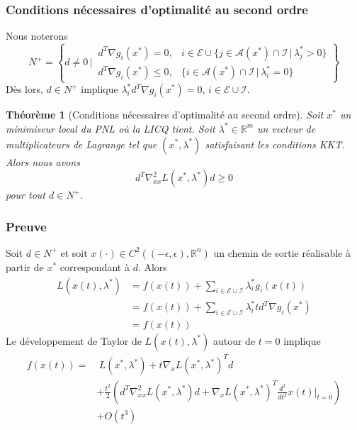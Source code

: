 \documentclass[usepdftitle=false]{beamer}
\newtheorem{thm}{Théorème}
\def\cA{\mathcal{A}}
\def\cE{\mathcal{E}}
\def\cI{\mathcal{I}}
\def\RR{\mathbb{R}}
\begin{document}
\begin{frame}
	\frametitle{Conditions nécessaires d'optimalité au second ordre}
	
Nous noterons
$$
N^+ =
\left\lbrace d \ne 0 \,\bigg|\,
\begin{matrix}
d^T \nabla g_i(x^*) = 0, & i \in \cE \cup \{ j \in \cA(x^*) \cap \cI \,|\, \lambda_j^* > 0 \} \\
d^T \nabla g_i(x^*) \leq 0, & \{ i \in \cA(x^*) \cap \cI \,|\, \lambda_i^* = 0 \} 
\end{matrix}
\right\rbrace
$$
Dès lors, $d \in N^+$ implique $\lambda_i^* d^T \nabla g_i(x^*) = 0$, $i \in \cE \cup \cI$.



\mbox{}

\begin{thm}[Conditions nécessaires d'optimalité au second ordre]
Soit $x^*$ un minimiseur local du PNL où la LICQ tient.
Soit $\lambda^* \in \RR^m$ un vecteur de multiplicateurs de Lagrange tel que $(x^*, \lambda^*)$ satisfaisant les conditions KKT.
Alors nous avons
$$
d^T \nabla^2_{xx} L(x^*, \lambda^*) d \geq 0
$$
pour tout $d \in N^+$.
\end{thm}

\end{frame}

\begin{frame}
\frametitle{Preuve}

Soit $d \in N^+$ et soit
$x(\cdot) \in C^2((-\epsilon, \epsilon), \RR^n)$
un chemin de sortie réalisable à partir de $x^*$ correspondant à $d$.
Alors
\begin{align*}
L(x(t), \lambda^*) &=
 f(x(t)) + \sum_{i \in \cE \cup \cI} \lambda_i^* g_i(x(t))\\
&= f(x(t)) + \sum_{i \in \cE \cup \cI} \lambda_i^* t d^T \nabla g_i(x^*) \\
&= f(x(t))
\end{align*}
Le développement de Taylor de $L(x(t),\lambda^*)$ autour de $t = 0$ implique
\begin{align*}
f(x(t)) = &\ L(x^*, \lambda^*) + t \nabla_x L(x^*, \lambda^*)^T d \\
& + \frac{t^2}{2}\left( d^T \nabla_{xx}^2 L(x^*, \lambda^*) d + \nabla_x L(x^*, \lambda^*)^T \frac{d^2}{dt^2}x(t)|_{t=0} \right) \\
& + O(t^3)
\end{align*}

\end{frame}
\end{document}
